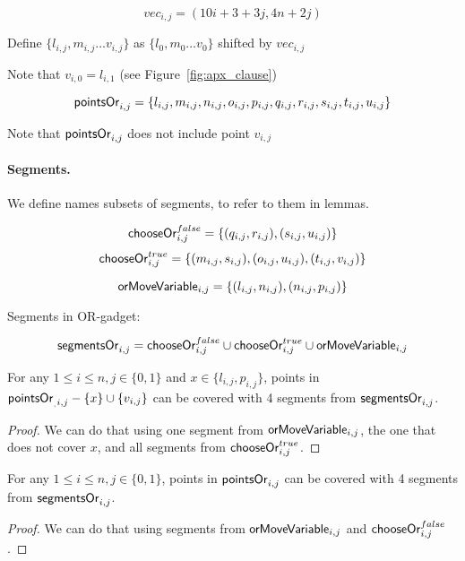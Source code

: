 	$$vec_{i, j} = (10i + 3 + 3j, 4n + 2j)$$
	
	Define 
	$\{ l_{i, j}, m_{i, j} \ldots v_{i, j} \}$
	as $\{l_0, m_0 \ldots v_0\}$ shifted by $vec_{i, j}$

Note that $v_{i, 0} = l_{i, 1}$ (see Figure~\ref{fig:apx_clause})
 
  $$\mathsf{pointsOr}_{i,j} = 
 \{l_{i, j}, m_{i, j}, n_{i, j}, o_{i, j},
 p_{i, j}, q_{i, j}, r_{i, j}, s_{i, j}, t_{i, j}, u_{i, j} \}
 $$
 
Note that $\mathsf{pointsOr}_{i,j}$ does not include point $v_{i,j}$
 
\paragraph{Segments.}

We define names subsets of segments, to refer to them in lemmas.
 
 
$$\mathsf{chooseOr}^{false}_{i,j} =
\{ (q_{i, j}, r_{i, j}), (s_{i, j}, u_{i, j})\}$$
$$\mathsf{chooseOr}^{true}_{i,j} =
\{ (m_{i, j}, s_{i, j}), (o_{i, j}, u_{i, j}),
(t_{i, j}, v_{i, j}) \}$$

$$\mathsf{orMoveVariable}_{i,j} =
\{ (l_{i, j}, n_{i, j}), (n_{i, j}, p_{i, j})\}$$

Segments in OR-gadget:

$$\mathsf{segmentsOr}_{i,j} = 
  \mathsf{chooseOr}^{false}_{i,j} \cup \mathsf{chooseOr}^{true}_{i,j} \cup \mathsf{orMoveVariable}_{i,j}
$$


\begin{lemma}
\label{cover_or_true}
For any $1 \le i \le n, j \in \{0, 1\}$ and 
 $x \in \{l_{i, j}, p_{i, j}\}$, points in
$\mathsf{pointsOr}_{_,i, j} - \{ x\} \cup \{v_{i, j}\}$
can be covered
with 4 segments from $\mathsf{segmentsOr}_{i,j}$.
\end{lemma}

\begin{proof}
We can do that using one segment from
$\mathsf{orMoveVariable}_{i,j}$, the one that does not cover $x$,
and all segments from $\mathsf{chooseOr}^{true}_{i,j}$.
\end{proof}

\begin{lemma}
\label{cover_or_false}
For any $1 \le i \le n, j \in \{0, 1\}$, points in
$\mathsf{pointsOr}_{i,j}$ can be covered
with 4 segments from $\mathsf{segmentsOr}_{i,j}$.
\end{lemma}

\begin{proof}
We can do that using segments from $\mathsf{orMoveVariable}_{i,j}$
and $\mathsf{chooseOr}^{false}_{i,j}$.
\end{proof}


